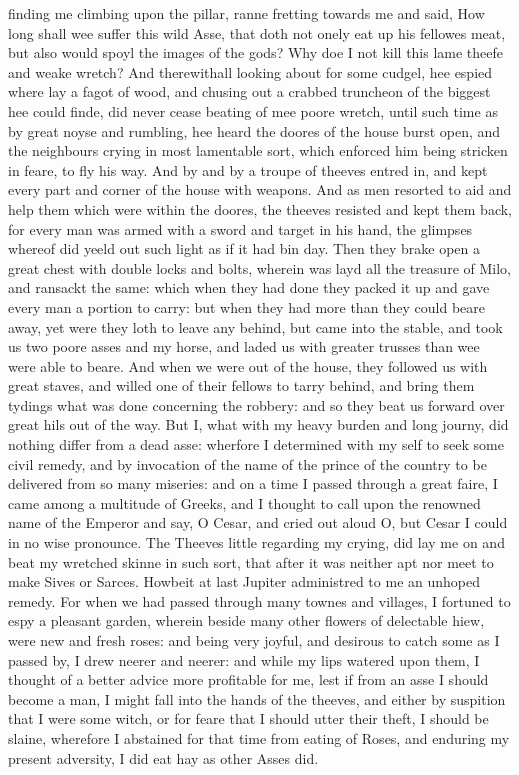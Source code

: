 finding me climbing upon the pillar, ranne fretting towards me and said, How
long shall wee suffer this wild Asse, that doth not onely eat up his fellowes
meat, but also would spoyl the images of the gods? Why doe I not kill this lame
theefe and weake wretch? And therewithall looking about for some cudgel, hee
espied where lay a fagot of wood, and chusing out a crabbed truncheon of the
biggest hee could finde, did never cease beating of mee poore wretch, until
such time as by great noyse and rumbling, hee heard the doores of the house
burst open, and the neighbours crying in most lamentable sort, which enforced
him being stricken in feare, to fly his way. And by and by a troupe of theeves
entred in, and kept every part and corner of the house with weapons. And as men
resorted to aid and help them which were within the doores, the theeves
resisted and kept them back, for every man was armed with a sword and target in
his hand, the glimpses whereof did yeeld out such light as if it had bin day.
Then they brake open a great chest with double locks and bolts, wherein was
layd all the treasure of Milo, and ransackt the same: which when they had done
they packed it up and gave every man a portion to carry: but when they had more
than they could beare away, yet were they loth to leave any behind, but came
into the stable, and took us two poore asses and my horse, and laded us with
greater trusses than wee were able to beare. And when we were out of the house,
they followed us with great staves, and willed one of their fellows to tarry
behind, and bring them tydings what was done concerning the robbery: and so
they beat us forward over great hils out of the way. But I, what with my heavy
burden and long journy, did nothing differ from a dead asse: wherfore I
determined with my self to seek some civil remedy, and by invocation of the
name of the prince of the country to be delivered from so many miseries: and on
a time I passed through a great faire, I came among a multitude of Greeks, and
I thought to call upon the renowned name of the Emperor and say, O Cesar, and
cried out aloud O, but Cesar I could in no wise pronounce. The Theeves little
regarding my crying, did lay me on and beat my wretched skinne in such sort,
that after it was neither apt nor meet to make Sives or Sarces. Howbeit at last
Jupiter administred to me an unhoped remedy. For when we had passed through
many townes and villages, I fortuned to espy a pleasant garden, wherein beside
many other flowers of delectable hiew, were new and fresh roses: and being very
joyful, and desirous to catch some as I passed by, I drew neerer and neerer:
and while my lips watered upon them, I thought of a better advice more
profitable for me, lest if from an asse I should become a man, I might fall
into the hands of the theeves, and either by suspition that I were some witch,
or for feare that I should utter their theft, I should be slaine, wherefore I
abstained for that time from eating of Roses, and enduring my present
adversity, I did eat hay as other Asses did.

